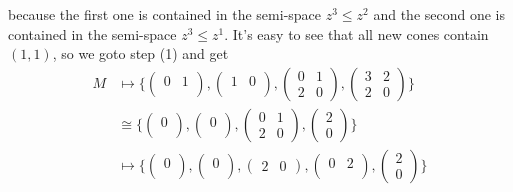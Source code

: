 \documentclass[12pt]{article}
\theoremstyle{definition}
\theoremstyle{plain}
\begin{document}
because the first one is contained in the semi-space $z^3\leq z^2$
and the second one is contained in the semi-space $z^3\leq z^1$.
It's easy to see that all new cones contain $(1,1)$, so we goto step (1) 
and get
\begin{align*}
	M&\mapsto 
	\biggl\{
		\begin{pmatrix}
			0&1\\
		\end{pmatrix},
		\begin{pmatrix}
			1&0\\
		\end{pmatrix},
		\begin{pmatrix}
			0&1\\
			2&0
		\end{pmatrix},
		\begin{pmatrix}
			3&2\\
			2&0
		\end{pmatrix}
	\biggr\}\\
	 &\cong
	 \biggl\{
		 \begin{pmatrix}
			 0\\
		 \end{pmatrix},
		 \begin{pmatrix}
			 0\\
		 \end{pmatrix},
		 \begin{pmatrix}
			 0&1\\
			 2&0
		 \end{pmatrix},
		 \begin{pmatrix}
			 2\\
			 0
		 \end{pmatrix}
	 \biggr\}\\
	 &\mapsto
	 \biggl\{
		 \begin{pmatrix}
			 0\\
		 \end{pmatrix},
		 \begin{pmatrix}
			 0\\
		 \end{pmatrix},
		 \begin{pmatrix}
			 2&0
		 \end{pmatrix},
		 \begin{pmatrix}
			 0&2\\
		 \end{pmatrix},
		 \begin{pmatrix}
			 2\\
			 0
		 \end{pmatrix}
	 \biggr\}
\end{align*}
\end{document}
